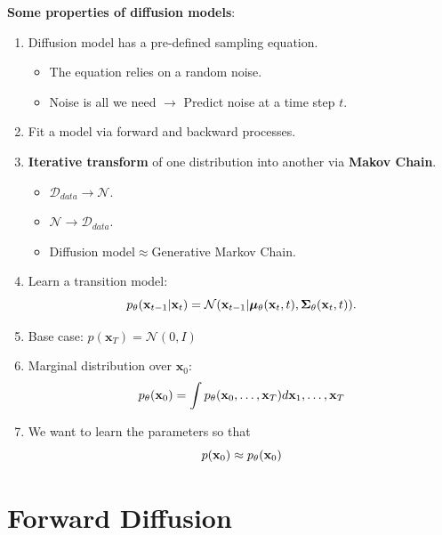 \textbf{Some properties of diffusion models}:
	\begin{enumerate}
		\item Diffusion model has a pre-defined sampling equation.
			\begin{itemize}
				\item The equation relies on a random noise.
				\item Noise is all we need $\to$ Predict noise at a time step $t$.
			\end{itemize}
		\item Fit a model via forward and backward processes.
		\item \textbf{Iterative transform} of one distribution into another via \textbf{Makov Chain}.
			\begin{itemize}
				\item $\mathcal{D}_{data}\to \mathcal{N}$.
				\item $\mathcal{N}\to \mathcal{D}_{data}$.
				\item Diffusion model$\approx$Generative Markov Chain.
			\end{itemize}
		\item Learn a transition model:
			$$p_\theta(\mathbf{x}_{t-1}|{\mathbf{x}}_t) = \mathcal{N}(\mathbf{x}_{t-1}|\boldsymbol{\mu}_{\theta}(\mathbf{x}_{t}, t), \boldsymbol{\Sigma}_\theta(\mathbf{x}_t,t)).$$
		\item Base case: $p(\mathbf{x}_T) = \mathcal{N}(0,I)$ 
		\item Marginal distribution over $\mathbf{x}_0$:
			$$p_\theta(\mathbf{x}_0) = \int p_\theta({\mathbf{x}}_0,\dots,\mathbf{x}_T)d{\mathbf{x}}_1,\dots,{\mathbf{x}}_T$$
		\item We want to learn the parameters so that
			$$p({\mathbf{x}}_0)\approx p_\theta({\mathbf{x}}_0)$$

	\end{enumerate}

\section{Forward Diffusion}

